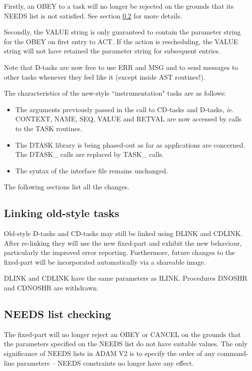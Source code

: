 \documentclass[twoside,11pt,nolof]{starlink}
\begin{document}
Firstly, an OBEY to a task will no longer be rejected on the grounds
that its NEEDS list is not satisfied. See section \ref{needs} for more details.

Secondly, the VALUE string is only guaranteed to contain the parameter
string for the OBEY on first entry to ACT. If the action is
rescheduling, the VALUE string will not have retained the parameter
string for subsequent entries.

Note that D-tasks are now free to use ERR and MSG and to send messages
to other tasks whenever they feel like it (except inside AST routines!).

The characteristics of the new-style ``instrumentation" tasks are as
follows:
\begin{itemize}
\item The arguments previously passed in the call to CD-tasks and D-tasks,
\emph{ie.} CONTEXT, NAME, SEQ, VALUE and RETVAL are now accessed by calls to the
TASK routines.
\item The DTASK library is being phased-out as far as applications are
concerned. The DTASK\_ calls are replaced by TASK\_ calls.
\item The syntax of the interface file remains unchanged.
\end{itemize}
The following sections list all the changes.

\subsection{Linking old-style tasks}

Old-style D-tasks and CD-tasks may still be linked using DLINK and CDLINK.
After re-linking they will use the new fixed-part and exhibit the new
behaviour, particularly the improved error reporting. Furthermore, future
changes to the fixed-part will be incorporated automatically via a shareable
image.

DLINK and CDLINK have the same parameters as ILINK. Procedures DNOSHR and
CDNOSHR are withdrawn.

\subsection{NEEDS list checking}
\label{needs}

The fixed-part will no longer reject an OBEY or CANCEL on the grounds
that the parameters specified on the NEEDS list do not have suitable
values.
The only significance of NEEDS lists in ADAM V2 is to specify the order of any
command-line parameters -- NEEDS constraints no longer have any effect.
\end{document}
